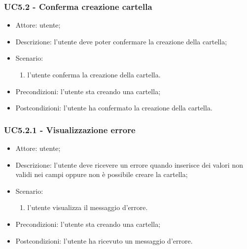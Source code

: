     \subsubsection{UC5.2 - Conferma creazione cartella}
    \begin{itemize}
        \item Attore: utente;
        \item Descrizione: l'utente deve poter confermare la creazione della cartella;
        \item Scenario:
        \begin{enumerate}
        \item l'utente conferma la creazione della cartella.
        \end{enumerate}
        \item Precondizioni: l'utente sta creando una cartella;
        \item Postcondizioni: l'utente ha confermato la creazione della cartella.
    \end{itemize}

    \subsubsection{UC5.2.1 - Visualizzazione errore }
    \begin{itemize}
        \item Attore: utente;
        \item Descrizione: l'utente deve ricevere un errore quando inserisce dei valori non validi nei campi oppure non è possibile creare la cartella;
        \item Scenario:
        \begin{enumerate}
        \item l'utente visualizza il messaggio d'errore.
        \end{enumerate}   
        \item Precondizioni: l'utente sta creando una cartella;
        \item Postcondizioni: l'utente ha ricevuto un messaggio d'errore.
    \end{itemize}

